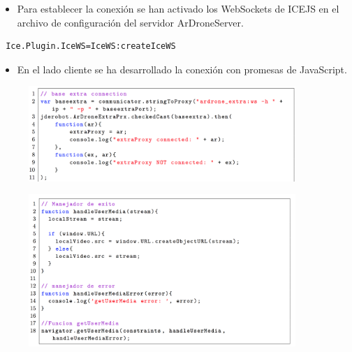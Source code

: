 \documentclass[notes,slidesec,a4]{seminar}
\begin{document}
\begin{hslide}
\begin{itemize}
\item Para establecer la conexión se han activado los WebSockets de ICEJS en el archivo de configuración del servidor ArDroneServer.
\end{itemize}
\lstset{}
\begin{lstlisting}
 Ice.Plugin.IceWS=IceWS:createIceWS
\end{lstlisting}
\begin{itemize}
\item En el lado cliente se ha desarrollado la conexión con promesas de JavaScript.
\end{itemize}

\begin{center}
\begin{figure}
\includegraphics[width=0.9\textwidth]{img/promiseconexionlocal}
\end{figure}
\end{center}
\end{hslide}


\begin{hslide}
\begin{center}
\begin{figure}
\includegraphics[width=0.9\textwidth]{img/getusermedia}
\end{figure}
\end{center}
\end{hslide}





\end{document}
